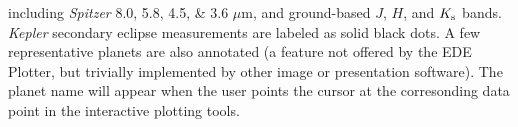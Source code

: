 including \textit{Spitzer} 8.0, 5.8, 4.5, \& 3.6 $\mu$m, and ground-based
$J$, $H$, and $K_{\rm s}$ bands. \textit{Kepler} secondary eclipse
measurements are labeled as solid black dots. A few representative
planets are also annotated (a feature not offered by the EDE
Plotter, but trivially implemented by other image or presentation
software). The planet name will appear when the user points the
cursor at the corresonding data point in the interactive plotting
tools.
%
%
%
%
%
%
%
%
% 
%
